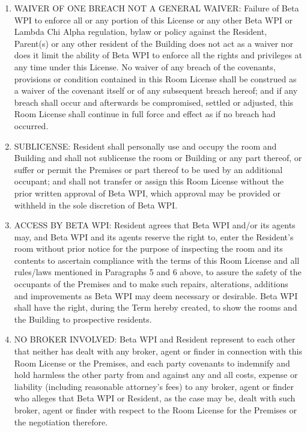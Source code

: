 \documentclass[legalpaper, 12pt]{article} \usepackage{lease}
\begin{document}
\begin{enumerate}
        \item WAIVER OF ONE BREACH NOT A GENERAL WAIVER: Failure of Beta WPI to
                enforce all or any portion of this License or any other Beta WPI
                or Lambda Chi Alpha regulation, bylaw or policy against the
                Resident, Parent(s) or any other resident of the Building does
                not act as a waiver nor does it limit the ability of Beta WPI to
                enforce all the rights and privileges at any time under this
                License.  No waiver of any breach of the covenants, provisions
                or condition contained in this Room License shall be construed
                as a waiver of the covenant itself or of any subsequent breach
                hereof; and if any breach shall occur and afterwards be
                compromised, settled or adjusted, this Room License shall
                continue in full force and effect as if no breach had occurred.

        \item SUBLICENSE: Resident shall personally use and occupy the room and
                Building and shall not sublicense the room or Building or any
                part thereof, or suffer or permit the Premises or part thereof
                to be used by an additional occupant; and shall not transfer or
                assign this Room License without the prior written approval of
                Beta WPI, which approval may be provided or withheld in the sole
                discretion of Beta WPI\@.

        \item ACCESS BY BETA WPI: Resident agrees that Beta WPI and/or its
                agents may, and Beta WPI and its agents reserve the right to,
                enter the Resident’s room without prior notice for the purpose
                of inspecting the room and its contents to ascertain compliance
                with the terms of this Room License and all rules/laws mentioned
                in Paragraphs 5 and 6 above, to assure the safety of the
                occupants of the Premises and to make such repairs, alterations,
                additions and improvements as Beta WPI may deem necessary or
                desirable.  Beta WPI shall have the right, during the Term
                hereby created, to show the rooms and the Building to
                prospective residents.

        \item NO BROKER INVOLVED: Beta WPI and Resident represent to each other
                that neither has dealt with any broker, agent or finder in
                connection with this Room License or the Premises, and each
                party covenants to indemnify and hold harmless the other party
                from and against any and all costs, expense or liability
                (including reasonable attorney’s fees) to any broker, agent or
                finder who alleges that Beta WPI or Resident, as the case may
                be, dealt with such broker, agent or finder with respect to the
                Room License for the Premises or the negotiation therefore.
        

\end{enumerate}
\end{document}
